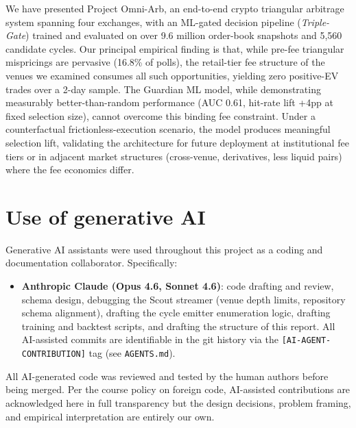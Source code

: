 \documentclass[11pt,a4paper]{article}
\begin{document}
We have presented Project Omni-Arb, an end-to-end crypto triangular arbitrage system spanning four exchanges, with an ML-gated decision pipeline (\emph{Triple-Gate}) trained and evaluated on over 9.6 million order-book snapshots and 5{,}560 candidate cycles. Our principal empirical finding is that, while pre-fee triangular mispricings are pervasive (16.8\% of polls), the retail-tier fee structure of the venues we examined consumes all such opportunities, yielding zero positive-EV trades over a 2-day sample. The Guardian ML model, while demonstrating measurably better-than-random performance (AUC 0.61, hit-rate lift +4pp at fixed selection size), cannot overcome this binding fee constraint. Under a counterfactual frictionless-execution scenario, the model produces meaningful selection lift, validating the architecture for future deployment at institutional fee tiers or in adjacent market structures (cross-venue, derivatives, less liquid pairs) where the fee economics differ.


\section*{Use of generative AI}

Generative AI assistants were used throughout this project as a coding and
documentation collaborator. Specifically:

\begin{itemize}
    \item \textbf{Anthropic Claude (Opus 4.6, Sonnet 4.6)}: code drafting and
          review, schema design, debugging the Scout streamer (venue depth
          limits, repository schema alignment), drafting the cycle emitter
          enumeration logic, drafting training and backtest scripts, and
          drafting the structure of this report. All AI-assisted commits are
          identifiable in the git history via the \texttt{[AI-AGENT-CONTRIBUTION]}
          tag (see \texttt{AGENTS.md}).
\end{itemize}

All AI-generated code was reviewed and tested by the human authors before being
merged. Per the course policy on foreign code, AI-assisted contributions are
acknowledged here in full transparency but the design decisions, problem
framing, and empirical interpretation are entirely our own.
\end{document}
